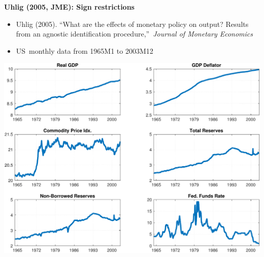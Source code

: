 \begin{frame}
{\textbf{Uhlig (2005, JME): Sign restrictions}}

\begin{minipage}{0.4\textwidth}
\bigskip
\begin{itemize}
\item Uhlig (2005). \textquotedblleft What are the effects of monetary policy on output? Results from an agnostic identification
procedure,\textquotedblright\ \emph{Journal of Monetary Economics} \bigskip

\item US\ monthly data from 1965M1 to 2003M12
\end{itemize}
\end{minipage}
\quad 
\begin{minipage}{0.55\textwidth}
\includegraphics[width=\textwidth]{Uhlig_DATA.pdf}
\end{minipage}
\end{frame}


